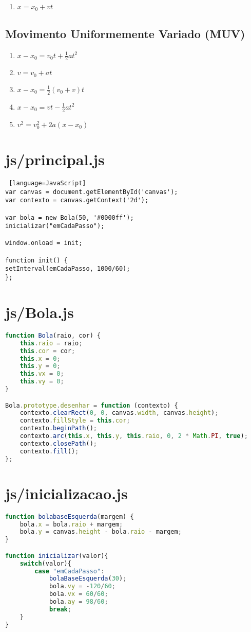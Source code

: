 \documentclass[12pt,a4paper,oneside]{article}
\begin{document}
\begin{enumerate}
\item $x = x_0 + vt$ 
\end{enumerate}

\subsection{Movimento Uniformemente Variado (MUV)}

\begin{enumerate}
\item $x - x_0 = v_0t + \frac{1}{2}at^2$ 
\item $v = v_0 + at$ 
\item $x - x_0 = \frac{1}{2}(v_0 + v)t$ 
\item $x - x_0 = vt - \frac{1}{2} a t^2$
\item $v^2 = v_0^2 + 2a(x - x_0)$
\end{enumerate}

\section*{js/principal.js}

\begin{lstlisting} [language=JavaScript]
var canvas = document.getElementById('canvas');
var contexto = canvas.getContext('2d');

var bola = new Bola(50, '#0000ff');
inicializar("emCadaPasso");

window.onload = init;

function init() {
setInterval(emCadaPasso, 1000/60);
};
\end{lstlisting}

\newpage

\section*{js/Bola.js}

\begin{lstlisting}[language=JavaScript]
function Bola(raio, cor) {
	this.raio = raio;
	this.cor = cor;
	this.x = 0;
	this.y = 0;
	this.vx = 0;
	this.vy = 0;
}

Bola.prototype.desenhar = function (contexto) {
	contexto.clearRect(0, 0, canvas.width, canvas.height);
	contexto.fillStyle = this.cor;
	contexto.beginPath();
	contexto.arc(this.x, this.y, this.raio, 0, 2 * Math.PI, true);
	contexto.closePath();
	contexto.fill();
};
\end{lstlisting}

\section*{js/inicializacao.js}

\begin{lstlisting}[language=JavaScript]
function bolabaseEsquerda(margem) {
	bola.x = bola.raio + margem;
	bola.y = canvas.height - bola.raio - margem;
}

function inicializar(valor){
	switch(valor){
		case "emCadaPasso":
			bolaBaseEsquerda(30);
			bola.vy = -120/60; 
			bola.vx = 60/60;
			bola.ay = 98/60;
			break;
	}
}
\end{lstlisting}
\end{document}
